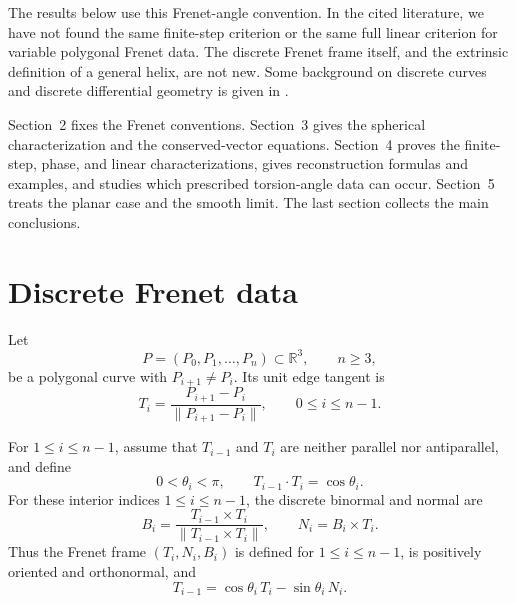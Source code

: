 \documentclass[10pt,a4paper]{amsart}
\theoremstyle{definition}
\theoremstyle{remark}
\numberwithin{equation}{section}
\begin{document}
The results below use this Frenet-angle convention. In the cited literature, we have not found the same finite-step criterion or the same full linear criterion for variable polygonal Frenet data. The discrete Frenet frame itself, and the extrinsic definition of a general helix, are not new. Some background on discrete curves and discrete differential geometry is given in \cite{BobenkoSuris2008,Hoffmann2009,Carroll2014}.

Section~2 fixes the Frenet conventions. Section~3 gives the spherical characterization and the conserved-vector equations. Section~4 proves the finite-step, phase, and linear characterizations, gives reconstruction formulas and examples, and studies which prescribed torsion-angle data can occur. Section~5 treats the planar case and the smooth limit. The last section collects the main conclusions.

\section{Discrete Frenet data}

Let
\[
P=(P_0,P_1,\ldots,P_n)\subset\mathbb R^3,\qquad n\ge 3,
\]
be a polygonal curve with \(P_{i+1}\neq P_i\). Its unit edge tangent is
\[
T_i=\frac{P_{i+1}-P_i}{\|P_{i+1}-P_i\|},
\qquad 0\le i\le n-1.
\]

For \(1\le i\le n-1\), assume that \(T_{i-1}\) and \(T_i\) are neither
parallel nor antiparallel, and define
\[
0<\theta_i<\pi,\qquad T_{i-1}\cdot T_i=\cos\theta_i.
\]
For these interior indices $1\le i\le n-1$, the discrete binormal and normal are
\[
B_i=\frac{T_{i-1}\times T_i}{\|T_{i-1}\times T_i\|},
\qquad
N_i=B_i\times T_i.
\]
Thus the Frenet frame \((T_i,N_i,B_i)\) is defined for $1\le i\le n-1$, is positively oriented and orthonormal, and
\begin{equation}
T_{i-1}=\cos\theta_i\,T_i-\sin\theta_i\,N_i.
\label{eq:backward-tangent}
\end{equation}
\end{document}
